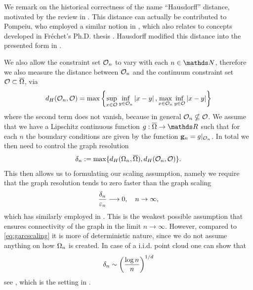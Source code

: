 \begin{remark}{}{}
We remark on the historical correctness of the name \enquote{Hausdorff} distance, motivated by the review in \cite{birsan2006one}. This distance can actually be contributed to Pompeiu, who employed a similar notion in \cite{pompeiu1905continuite}, which also relates to concepts developed in Fréchet's Ph.D. thesis \cite{frechet1906quelques}. Hausdorff modified this distance into the presented form in \cite{hausdorff1914}.
\end{remark}
%
%
\noindent%
We also allow the constraint set $\mathcal{O}_n$ to vary with each $n\in\N$, therefore we also measure the distance between $\mathcal{O}_n$ and the continuum constraint set $\mathcal{O}\subset\overline{\Omega}$, via
%
\begin{align*}
d_H(\mathcal{O}_n, \mathcal{O}) = 
\max
\left\{
\sup_{x\in\mathcal{O}} \inf_{y\in\mathcal{O}_n} \left|x-y\right|,  
\max_{x\in\mathcal{O}_n} \inf_{y\in\mathcal{O}} \left|x-y\right|
\right\}
\end{align*}
%
where the second term does not vanish, because in general $\mathcal{O}_n\nsubseteq\mathcal{O}$. We assume that we have a Lipschitz continuous function $g:\cl\domain\to\R$ such that for each $n$ the boundary conditions are given by the function $\mathbf{g}_n = g\rvert_{\mathcal{O}_n}$. In total we then need to control the graph resolution 
%
\begin{align*}
\delta_n := \max\{d_H(\Omega_n, \overline{\Omega}), d_H(\mathcal{O}_n, \mathcal{O})\}.
\end{align*}
%
This then allows us to formulating our scaling assumption, namely we require that the graph resolution tends to zero faster than the graph scaling
%
\begin{align}\label{eq:scaling}
\frac{\delta_n}{\varepsilon_n}\longrightarrow 0, \quad n \to \infty,
\end{align}
%
which has similarly employed in \cite{penrose1999strong,penrose1999strong2}. This is the weakest possible assumption that ensures connectivity of the graph in the limit $n\to\infty$. However, compared to \cref{eq:garcscaling} it is more of deterministic nature, since we do not assume anything on how $\Omega_n$ is created. In case of a i.i.d. point cloud one can show that
%
\begin{align*}
\delta_n \sim \left(\frac{\log n}{n}\right)^{1/d}
\end{align*}
%
see \cite{penrose1999strong2}, which is the setting in \cite{GarcSlep15}.
%
%
